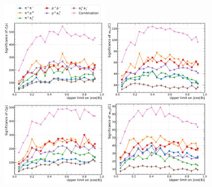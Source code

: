\documentclass[a4paper,12pt,twocolumn]{article}
\numberwithin{equation}{section} %
\begin{document}
\begin{figure}[ht!]
\centering
\includegraphics[width=0.48\textwidth]{./plot_concurrenceSignificance_genMode_mlfitSpinAnalyzer_byDecayMode.pdf}
\includegraphics[width=0.48\textwidth]{./plot_RchshSignificance_genMode_mlfitSpinAnalyzer_byDecayMode.pdf}
\includegraphics[width=0.48\textwidth]{./plot_concurrenceSignificance_kinFitMode_mlfitSpinAnalyzer_byDecayMode.pdf}
\includegraphics[width=0.48\textwidth]{./plot_RchshSignificance_kinFitMode_mlfitSpinAnalyzer_byDecayMode.pdf}

\end{figure}
\end{document}
